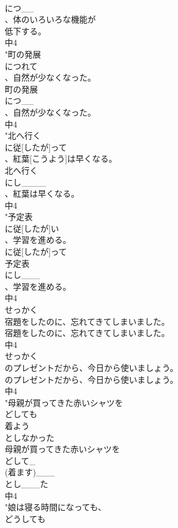 \documentclass[8pt]{extreport}
\begin{document}
\begin{CJK}{UTF8}{min}
\\	につ__
\\	、体のいろいろな機能が
\\	低下する。
\\	中4
\\	"町の発展
\\	につれて
\\	、自然が少なくなった。
\\	町の発展
\\	につ__
\\	、自然が少なくなった。
\\	中4
\\	"北へ行く
\\	に従[したが]って
\\	、紅葉[こうよう]は早くなる。
\\	北へ行く
\\	にし____
\\	、紅葉は早くなる。
\\	中4
\\	"予定表
\\	に従[したが]い
\\	、学習を進める。
\\	に従[したが]って
\\	予定表
\\	にし___
\\	、学習を進める。
\\	中4
\\	せっかく
\\	宿題をしたのに、忘れてきてしまいました。
\\	宿題をしたのに、忘れてきてしまいました。
\\	中4
\\	せっかく
\\	のプレゼントだから、今日から使いましょう。
\\	のプレゼントだから、今日から使いましょう。
\\	中4
\\	"母親が買ってきた赤いシャツを
\\	どしても
\\	着よう
\\	としなかった
\\	母親が買ってきた赤いシャツを
\\	どして_
\\	(着ます)___
\\	とし___た
\\	中4
\\	"娘は寝る時間になっても、
\\	どうしても

\end{CJK}
\end{document}

